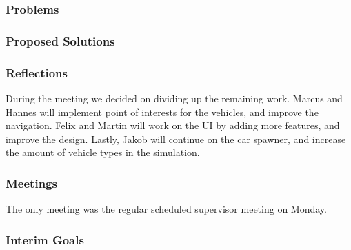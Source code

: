 \subsubsection{Problems}


\subsubsection{Proposed Solutions}


\subsubsection{Reflections}

    During the meeting we decided on dividing up the remaining work. Marcus and Hannes will implement point of interests for the vehicles, and improve the navigation. Felix and Martin will work on the UI by adding more features, and improve the design. Lastly, Jakob will continue on the car spawner, and increase the amount of vehicle types in the simulation.

\subsubsection{Meetings}

    The only meeting was the regular scheduled supervisor meeting on Monday.

\subsubsection{Interim Goals}



